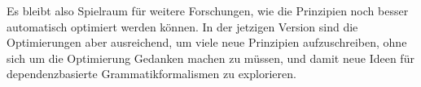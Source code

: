 






Es bleibt also Spielraum f\"ur weitere Forschungen, wie die Prinzipien
noch besser automatisch optimiert werden k\"onnen. In der jetzigen
Version sind die Optimierungen aber ausreichend, um viele neue
Prinzipien aufzuschreiben, ohne sich um die Optimierung Gedanken
machen zu m\"ussen, und damit neue Ideen f\"ur dependenzbasierte
Grammatikformalismen zu explorieren.
